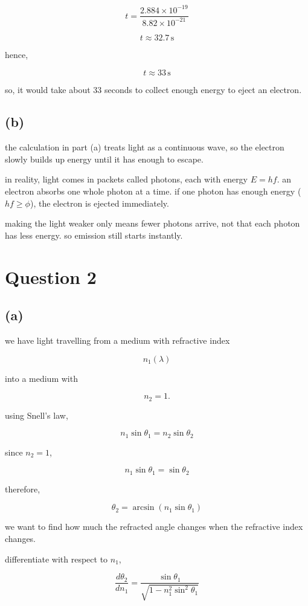 \documentclass{article}
\begin{document}
\[
t=
\frac{2.884\times10^{-19}}
{8.82\times10^{-21}}
\]

\[
t\approx32.7\,\mathrm{s}
\]

hence,

\[
\boxed{t\approx33\,\mathrm{s}}
\]

so, it would take about 33 seconds to collect enough energy to eject an electron.

\subsection*{(b)}

the calculation in part (a) treats light as a continuous wave, so the electron slowly builds up energy until it has enough to escape.
 
in reality, light comes in packets called photons, each with energy $E=hf$. an electron absorbs one whole photon at a time. if one photon has enough energy ($hf\geq\phi$), the electron is ejected immediately.
 
making the light weaker only means fewer photons arrive, not that each photon has less energy. so emission still starts instantly.

\section*{Question 2}

\subsection*{(a)}

we have light travelling from a medium with refractive index

\[
n_1(\lambda)
\]

into a medium with

\[
n_2=1.
\]

using Snell's law,

\[
n_1\sin\theta_1=n_2\sin\theta_2
\]

since $n_2=1$,

\[
n_1\sin\theta_1=\sin\theta_2
\]

therefore,

\[
\theta_2=\arcsin(n_1\sin\theta_1)
\]

we want to find how much the refracted angle changes when the refractive index changes.

differentiate with respect to $n_1$,

\[
\boxed{
\frac{d\theta_2}{dn_1}
=
\frac{\sin\theta_1}
{\sqrt{1-n_1^2\sin^2\theta_1}}
}
\]
\end{document}
